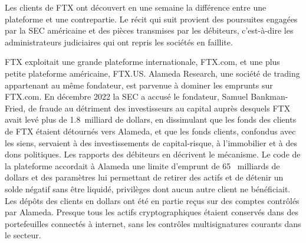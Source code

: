 Les clients de FTX ont découvert en une semaine la différence entre une plateforme et une contrepartie. Le récit
qui suit provient des poursuites engagées par la SEC américaine et des pièces
transmises par les débiteurs, c'est-à-dire les administrateurs judiciaires qui ont repris les sociétés en faillite.

FTX exploitait une grande plateforme internationale, FTX.com, et une plus petite plateforme américaine, FTX.US. Alameda Research, une
société de trading appartenant au même fondateur, est parvenue à dominer les emprunts sur FTX.com. En décembre 2022
la SEC a accusé le fondateur, Samuel Bankman-Fried, de fraude au détriment des investisseurs au capital auprès desquels FTX avait
levé plus de 1.8~milliard de dollars, en dissimulant que les fonds des clients de FTX étaient détournés vers Alameda,
et que les fonds clients, confondus avec les siens, servaient à des investissements de capital-risque, à l'immobilier et à des dons politiques.
Les rapports des débiteurs en décrivent le mécanisme. Le code de la plateforme accordait à Alameda une limite d'emprunt de 65~
milliards de dollars et des paramètres lui permettant de retirer des actifs et de détenir un solde négatif sans être liquidé,
privilèges dont aucun autre client ne bénéficiait. Les dépôts des clients en dollars ont été en partie reçus sur des comptes
contrôlés par Alameda. Presque tous les actifs cryptographiques étaient conservés dans des portefeuilles connectés à internet, sans
les contrôles multisignatures courants dans le secteur.

